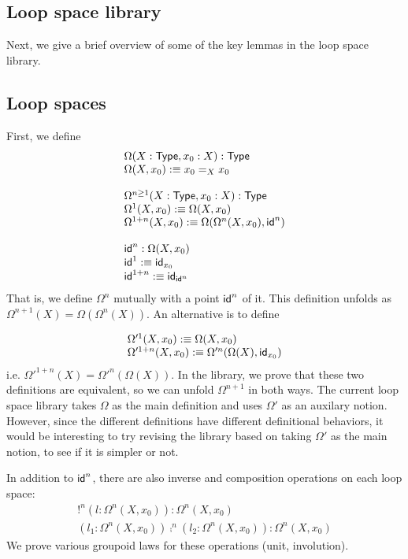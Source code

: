 \subsection{Loop space library}
\label{sec:loopspace}

Next, we give a brief overview of some of the key lemmas in the loop
space library.

\subsection{Loop spaces}
First, we define
\[
\begin{array}{l}
\Omega(X : \mathsf{Type},x_0 : X) : \mathsf{Type}\\
\Omega(X,x_0) :\equiv x_0 =_X x_0 \\
\\
\Omega^{n \ge 1}(X : \mathsf{Type} , x_0 : X) : \mathsf{Type}\\
\Omega^1(X,x_0) :\equiv \Omega(X,x_0) \\
\Omega^{1+n}(X,x_0) :\equiv \Omega(\Omega^n(X,x_0), \mathsf{id}^n) \\
\\ 
\mathsf{id}^n : \Omega(X,x_0) \\
\mathsf{id}^1 :\equiv \mathsf{id}_{x_0} \\
\mathsf{id}^{1+n} :\equiv \mathsf{id}_{\mathsf{id}^n} \\
\end{array}
\]
That is, we define $\Omega^n$ mutually with a point $\mathsf{id}^n$ of it.   
This definition unfolds as $\Omega^{n+1}(X) = \Omega(\Omega^n(X))$.  An
alternative is to define

\[
\begin{array}{l}
\Omega'^1(X,x_0) :\equiv \Omega(X,x_0) \\
\Omega'^{1+n}(X,x_0) :\equiv \Omega'^n(\Omega(X),\mathsf{id}_{x_0})
\end{array}
\]
i.e. $\Omega'^{1+n}(X) = \Omega'^n(\Omega(X))$.  In the library, we
prove that these two definitions are equivalent, so we can unfold
$\Omega^{n+1}$ in both ways.  The current loop space library takes
$\Omega$ as the main definition and uses $\Omega'$ as an auxilary
notion.  However, since the different definitions have different   
definitional behaviors, it would be interesting to try revising the
library based on taking $\Omega'$ as the main notion, to see if it is
simpler or not.  

In addition to $\mathsf{id}^n$, there are also inverse and composition
operations on each loop space:
\[
\begin{array}{l}
!^n (l : \Omega^n(X,x_0)) : \Omega^n(X,x_0) \\
(l_1 : \Omega^n(X,x_0)) \comp^n (l_2 : \Omega^n(X,x_0)) : \Omega^n(X,x_0)
\end{array}
\]
We prove various groupoid laws for these operations (unit, involution).

